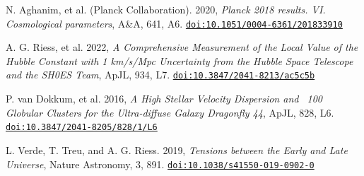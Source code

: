 \documentclass{BSpacePaper} %
\begin{document}
\begin{thebibliography}{99}
N. Aghanim, et al. (Planck Collaboration). 2020, \textit{Planck 2018 results. VI. Cosmological parameters}, A\&A, 641, A6. \href{https://doi.org/10.1051/0004-6361/201833910}{\nolinkurl{doi:10.1051/0004-6361/201833910}}

A. G. Riess, et al. 2022, \textit{A Comprehensive Measurement of the Local Value of the Hubble Constant with 1 km/s/Mpc Uncertainty from the Hubble Space Telescope and the SH0ES Team}, ApJL, 934, L7. \href{https://doi.org/10.3847/2041-8213/ac5c5b}{\nolinkurl{doi:10.3847/2041-8213/ac5c5b}}

P. van Dokkum, et al. 2016, \textit{A High Stellar Velocity Dispersion and ~100 Globular Clusters for the Ultra-diffuse Galaxy Dragonfly 44}, ApJL, 828, L6. \href{https://doi.org/10.3847/2041-8205/828/1/L6}{\nolinkurl{doi:10.3847/2041-8205/828/1/L6}}

L. Verde, T. Treu, and A. G. Riess. 2019, \textit{Tensions between the Early and Late Universe}, Nature Astronomy, 3, 891. \href{https://doi.org/10.1038/s41550-019-0902-0}{\nolinkurl{doi:10.1038/s41550-019-0902-0}}

\end{thebibliography}

\clearpage
\end{document}
